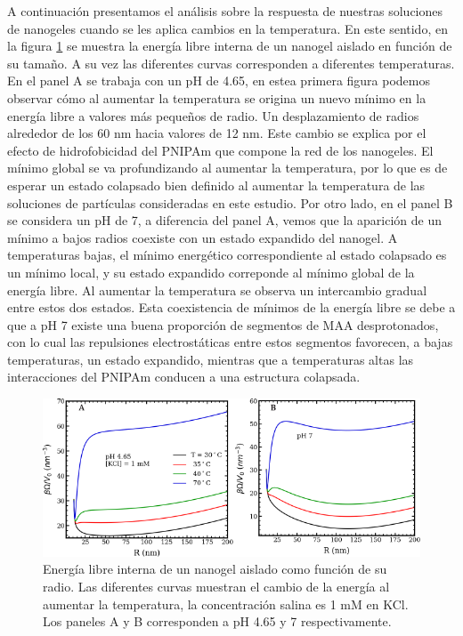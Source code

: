 A continuaci\'on presentamos el an\'alisis sobre la respuesta de nuestras soluciones de nanogeles cuando se les aplica  cambios en la temperatura. En este sentido, en la figura \ref{fig:mc:dfs_energy} se muestra la energ\'ia libre interna de un nanogel aislado en funci\'on de su tama\~no. A su vez las diferentes curvas corresponden a diferentes temperaturas. En el panel A se trabaja con un pH  de 4.65,  en estea primera figura podemos observar c\'omo al aumentar la temperatura se origina un nuevo m\'inimo en la energ\'ia libre a valores m\'as peque\~nos de radio. Un desplazamiento de radios alrededor de los 60 nm hacia valores de 12 nm. Este cambio se explica por el efecto de hidrofobicidad del PNIPAm que compone la red de los nanogeles. El m\'inimo global se va profundizando al aumentar la temperatura, por lo que es de esperar un estado colapsado bien definido al aumentar la temperatura de las soluciones de part\'iculas consideradas en este estudio. 
Por otro lado, en el panel B se considera un pH de 7, a diferencia del panel A, vemos que la aparici\'on de un m\'inimo a bajos radios coexiste con un estado expandido del nanogel. A temperaturas bajas, el m\'inimo energ\'etico correspondiente al estado colapsado es un m\'inimo local, y su estado expandido correponde al m\'inimo global de la energ\'ia libre. Al aumentar la temperatura se observa un intercambio gradual entre estos dos estados. Esta coexistencia de m\'inimos de la energ\'ia libre se debe a que a pH 7 existe una buena proporci\'on de segmentos de MAA desprotonados, con lo cual las repulsiones electrost\'aticas entre estos segmentos favorecen, a bajas temperaturas, un estado expandido, mientras que a temperaturas altas las interacciones del PNIPAm conducen a una estructura colapsada.%

	
	
	\begin{figure}[!htb]
		\centering
		\includegraphics[width=0.99\linewidth]{Figures/graph-mc/dfs_energy.pdf}
		\caption{Energ\'ia libre interna de un nanogel aislado como funci\'on de su radio. Las diferentes curvas muestran el cambio de la energ\'ia al aumentar la temperatura, la concentraci\'on salina es 1 mM en KCl. Los paneles A y B corresponden a pH 4.65 y 7 respectivamente.}
		\label{fig:mc:dfs_energy}
	\end{figure}

